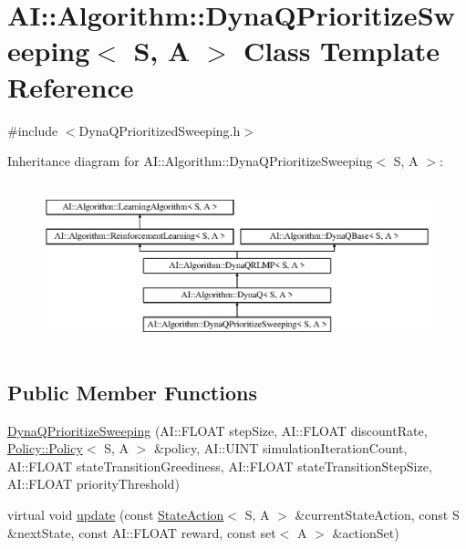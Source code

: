 \hypertarget{classAI_1_1Algorithm_1_1DynaQPrioritizeSweeping}{\section{A\-I\-:\-:Algorithm\-:\-:Dyna\-Q\-Prioritize\-Sweeping$<$ S, A $>$ Class Template Reference}
\label{classAI_1_1Algorithm_1_1DynaQPrioritizeSweeping}
}


{\ttfamily \#include $<$Dyna\-Q\-Prioritized\-Sweeping.\-h$>$}

Inheritance diagram for A\-I\-:\-:Algorithm\-:\-:Dyna\-Q\-Prioritize\-Sweeping$<$ S, A $>$\-:\begin{figure}[H]
\begin{center}
\leavevmode
\includegraphics[height=4.794520cm]{classAI_1_1Algorithm_1_1DynaQPrioritizeSweeping}
\end{center}
\end{figure}
\subsection*{Public Member Functions}
\begin{DoxyCompactItemize}
\item 
\hyperlink{classAI_1_1Algorithm_1_1DynaQPrioritizeSweeping_ac1b32e8772e967a3bb74ac34708e4dfe}{Dyna\-Q\-Prioritize\-Sweeping} (A\-I\-::\-F\-L\-O\-A\-T step\-Size, A\-I\-::\-F\-L\-O\-A\-T discount\-Rate, \hyperlink{classAI_1_1Algorithm_1_1Policy_1_1Policy}{Policy\-::\-Policy}$<$ S, A $>$ \&policy, A\-I\-::\-U\-I\-N\-T simulation\-Iteration\-Count, A\-I\-::\-F\-L\-O\-A\-T state\-Transition\-Greediness, A\-I\-::\-F\-L\-O\-A\-T state\-Transition\-Step\-Size, A\-I\-::\-F\-L\-O\-A\-T priority\-Threshold)
\item 
virtual void \hyperlink{classAI_1_1Algorithm_1_1DynaQPrioritizeSweeping_ad08b55f3cf927189dd31abf9fc1c2959}{update} (const \hyperlink{classAI_1_1StateAction}{State\-Action}$<$ S, A $>$ \&current\-State\-Action, const S \&next\-State, const A\-I\-::\-F\-L\-O\-A\-T reward, const set$<$ A $>$ \&action\-Set)
\end{DoxyCompactItemize}
